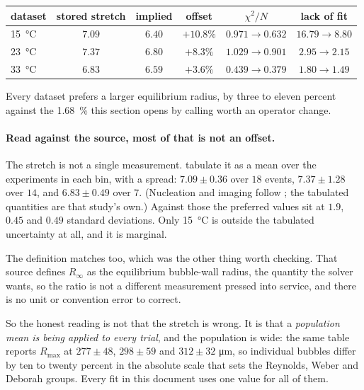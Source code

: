 \documentclass[10pt]{article}
\begin{document}
\begin{center}
\begin{tabular}{lccccc}
\toprule
dataset & stored stretch & implied & offset & $\chi^2/N$ & lack of fit \\
\midrule
\SI{15}{\celsius} & $7.09$ & $6.40$ & $\mathbf{+10.8\%}$ & $0.971 \to 0.632$ & $16.79 \to 8.80$ \\
\SI{23}{\celsius} & $7.37$ & $6.80$ & $+8.3\%$ & $1.029 \to 0.901$ & $2.95 \to 2.15$ \\
\SI{33}{\celsius} & $6.83$ & $6.59$ & $+3.6\%$ & $0.439 \to 0.379$ & $1.80 \to 1.49$ \\
\bottomrule
\end{tabular}
\end{center}

\noindent Every dataset prefers a larger equilibrium radius, by three to eleven percent against
the \SI{1.68}{\percent} this section opens by calling worth an operator change.

\paragraph{Read against the source, most of that is not an offset.} The stretch is not a single
measurement. \citet{chu2026limits} tabulate it as a mean over the experiments in each bin, with
a spread: $7.09 \pm 0.36$ over $18$ events, $7.37 \pm 1.28$ over $14$, and $6.83 \pm 0.49$ over
$7$. (Nucleation and imaging follow \citet{abeid2024experimental}; the tabulated quantities are
that study's own.) Against those the preferred values sit at $1.9$, $0.45$ and $0.49$
standard deviations. Only \SI{15}{\celsius} is outside the tabulated uncertainty at all, and it
is marginal.

The definition matches too, which was the other thing worth checking. That source defines
$R_\infty$ as the equilibrium bubble-wall radius, the quantity the solver wants, so the
ratio is not a different measurement pressed into service, and there is no unit or convention
error to correct.

So the honest reading is not that the stretch is wrong. It is that a \emph{population mean is
being applied to every trial}, and the population is wide: the same table reports $R_{\max}$ at
$277\pm48$, $298\pm59$ and $312\pm32$ \si{\micro\metre}, so individual bubbles differ by ten to
twenty percent in the absolute scale that sets the Reynolds, Weber and Deborah groups. Every fit
in this document uses one value for all of them.
\end{document}
